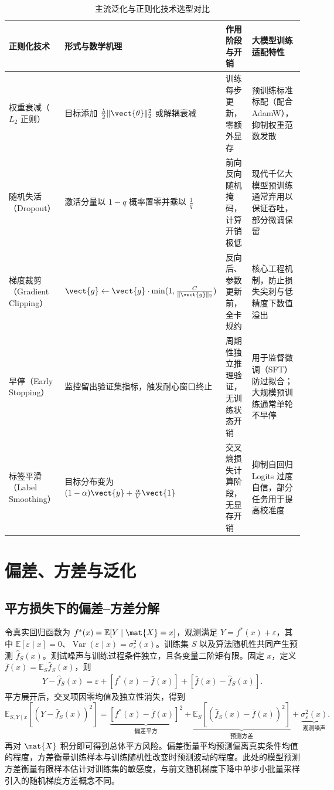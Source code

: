 \documentclass[../textbook.tex]{subfiles}
\begin{document}
\begin{table}[htbp]
\centering
\caption{主流泛化与正则化技术选型对比}
\label{tab:opt-regularization}
\begin{tabularx}{\linewidth}{lXXX}
\toprule
正则化技术 & 形式与数学机理 & 作用阶段与开销 & 大模型训练适配特性\\\midrule
权重衰减（$L_2$ 正则） & 目标添加 $\frac{\lambda}{2}\|\vect{\theta}\|_2^2$ 或解耦衰减 & 训练每步更新，零额外显存 & 预训练标准标配（配合 AdamW），抑制权重范数发散\\
随机失活（Dropout） & 激活分量以 $1-q$ 概率置零并乘以 $\frac{1}{q}$ & 前向反向随机掩码，计算开销极低 & 现代千亿大模型预训练通常弃用以保证吞吐，部分微调保留\\
梯度裁剪（Gradient Clipping） & $\vect{g} \gets \vect{g} \cdot \min(1, \frac{C}{\|\vect{g}\|_2})$ & 反向后、参数更新前，全卡规约 & 核心工程机制，防止损失尖刺与低精度下数值溢出\\
早停（Early Stopping） & 监控留出验证集指标，触发耐心窗口终止 & 周期性独立推理验证，无训练状态开销 & 用于监督微调（SFT）防过拟合；大规模预训练通常单轮不早停\\
标签平滑（Label Smoothing） & 目标分布变为 $(1-\alpha)\vect{y} + \frac{\alpha}{V}\vect{1}$ & 交叉熵损失计算阶段，无显存开销 & 抑制自回归 Logits 过度自信，部分任务用于提高校准度\\
\bottomrule
\end{tabularx}
\end{table}

\section{偏差、方差与泛化}

\subsection{平方损失下的偏差--方差分解}
令真实回归函数为 $f^*(x)=\mathbb E[Y\mid \mat{X}=x]$，观测满足 $Y=f^*(x)+\varepsilon$，其中 $\mathbb E[\varepsilon\mid x]=0$、$\operatorname{Var}(\varepsilon\mid x)=\sigma_\varepsilon^2(x)$。训练集 $S$ 以及算法随机性共同产生预测 $\widehat f_S(x)$。测试噪声与训练过程条件独立，且各变量二阶矩有限。固定 $x$，定义 $\bar f(x)=\mathbb E_S\widehat f_S(x)$，则
\begin{align}
 Y-\widehat f_S(x)
 =\varepsilon+[f^*(x)-\bar f(x)]+[\bar f(x)-\widehat f_S(x)].
\end{align}
平方展开后，交叉项因零均值及独立性消失，得到
\begin{equation}
 \mathbb E_{S,Y\mid x}[(Y-\widehat f_S(x))^2]
 =\underbrace{[f^*(x)-\bar f(x)]^2}_{\text{偏差平方}}
 +\underbrace{\mathbb E_S[(\widehat f_S(x)-\bar f(x))^2]}_{\text{预测方差}}
 +\underbrace{\sigma_\varepsilon^2(x)}_{\text{观测噪声}}.\label{eq:opt-biasvariance}
\end{equation}
再对 $\mat{X}$ 积分即可得到总体平方风险。偏差衡量平均预测偏离真实条件均值的程度，方差衡量训练样本与训练随机性改变时预测波动的程度。此处的模型预测方差衡量有限样本估计对训练集的敏感度，与前文随机梯度下降中单步小批量采样引入的随机梯度方差概念不同。
\end{document}
